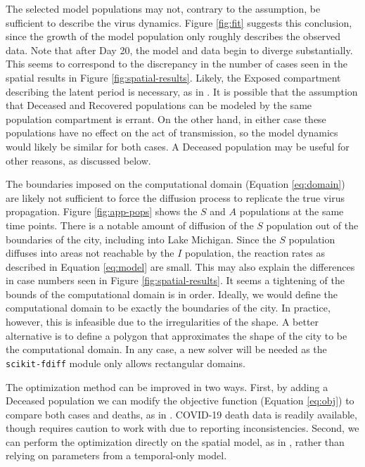 \documentclass[11pt]{article}
\begin{document}
	The selected model populations may not, contrary to the assumption, be sufficient to describe the virus dynamics.
	Figure \ref{fig:fit} suggests this conclusion, since the growth of the model population only roughly describes the observed data.
	Note that after Day 20, the model and data begin to diverge substantially.
	This seems to correspond to the discrepancy in the number of cases seen in the spatial results in Figure \ref{fig:spatial-results}.
	Likely, the Exposed compartment describing the latent period is necessary, as in \cite{Mammeri+2020+102+113}.
	It is possible that the assumption that Deceased and Recovered populations can be modeled by the same population compartment is errant.
	On the other hand, in either case these populations have no effect on the act of transmission, so the model dynamics would likely be similar for both cases.
	A Deceased population may be useful for other reasons, as discussed below.
	
	The boundaries imposed on the computational domain (Equation \ref{eq:domain}) are likely not sufficient to force the diffusion process to replicate the true virus propagation.
	Figure \ref{fig:app-pops} shows the $S$ and $A$ populations at the same time points.
	There is a notable amount of diffusion of the $S$ population out of the boundaries of the city, including into Lake Michigan.
	Since the $S$ population diffuses into areas not reachable by the $I$ population, the reaction rates as described in Equation \ref{eq:model} are small.
	This may also explain the differences in case numbers seen in Figure \ref{fig:spatial-results}.
	It seems a tightening of the bounds of the computational domain is in order.
	Ideally, we would define the computational domain to be exactly the boundaries of the city.
	In practice, however, this is infeasible due to the irregularities of the shape.
	A better alternative is to define a polygon that approximates the shape of the city to be the computational domain.
	In any case, a new solver will be needed as the \verb|scikit-fdiff| module only allows rectangular domains.
	
	The optimization method can be improved in two ways.
	First, by adding a Deceased population we can modify the objective function (Equation \ref{eq:obj}) to compare both cases and deaths, as in \cite{Kevrekidis-2021}.
	COVID-19 death data is readily available, though requires caution to work with due to reporting inconsistencies.
	Second, we can perform the optimization directly on the spatial model, as in \cite{Mammeri+2020+102+113}, rather than relying on parameters from a temporal-only model.
\end{document}

